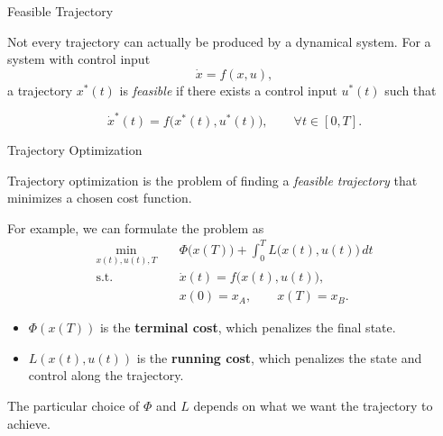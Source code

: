 \documentclass{beamer}
\begin{document}
\begin{frame}{Feasible Trajectory}
	\begin{flushleft}
	
	Not every trajectory can actually be produced by a dynamical system. For a system with control input
	\[
	\dot{x}=f(x,u),
	\]
	a trajectory $x^*(t)$ is \emph{feasible} if there exists 	a control input $u^*(t)$ such that
	
	\[
	\dot{x}^*(t)
	=
	f\bigl(x^*(t),u^*(t)\bigr),
	\qquad
	\forall t\in[0,T].
	\]
	
	
	\bigskip
	
	\begin{center}
	\end{center}
	
	\end{flushleft}
\end{frame}



\begin{frame}{Trajectory Optimization}
	\begin{flushleft}
		Trajectory optimization is the problem of finding a
		\emph{feasible trajectory} that minimizes a chosen
		cost function.
		
		\vspace{0.5em}
		
		For example, we can formulate the problem as
		\[
		\begin{aligned}
			\min_{x(t),u(t),T}\quad
			&
			\Phi\bigl(x(T)\bigr)
			+
			\int_0^T L\bigl(x(t),u(t)\bigr)\,dt
			\\
			\text{s.t.}\quad
			&
			\dot{x}(t)=f\bigl(x(t),u(t)\bigr),
			\\
			&
			x(0)=x_A,
			\qquad
			x(T)=x_B.
		\end{aligned}
		\]
		
		\begin{itemize}
			\item $\Phi(x(T))$ is the \textbf{terminal cost}, which
			penalizes the final state.
			
			\item $L(x(t),u(t))$ is the \textbf{running cost}, which
			penalizes the state and control along the trajectory.
		\end{itemize}
		
		The particular choice of $\Phi$ and $L$ depends on what
		we want the trajectory to achieve.
	\end{flushleft}
\end{frame}
\end{document}
